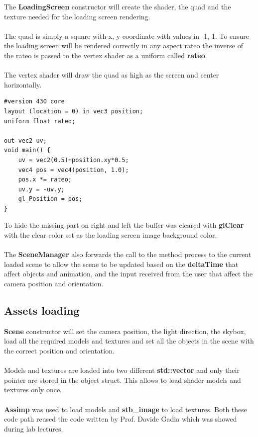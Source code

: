 \documentclass[12pt, a4paper]{article}
\begin{document}
The \textbf{LoadingScreen} constructor will create the shader, the quad and the texture needed for the loading screen
rendering.\\\\
The quad is simply a square with x, y coordinate with values in -1, 1. To ensure the loading screen will be rendered correctly
in any aspect rateo the inverse of the rateo is passed to the vertex shader as a uniform called \textbf{rateo}.\\\\
The vertex shader will draw the quad as high as the screen and center horizontally.
\begin{lstlisting}[caption={Loading screen vertex shader},captionpos=b]
#version 430 core
layout (location = 0) in vec3 position;
uniform float rateo;
    
out vec2 uv;
void main() {
    uv = vec2(0.5)+position.xy*0.5;
    vec4 pos = vec4(position, 1.0);
    pos.x *= rateo;
    uv.y = -uv.y;
    gl_Position = pos;
}
\end{lstlisting}
To hide the missing part on right and left
the buffer was cleared with \textbf{glClear} with the clear color set as the loading screen image background color.\\\\
The \textbf{SceneManager} also forwards the call to the method process to the current loaded scene to allow the scene
to be updated based on the \textbf{deltaTime} that affect objects and animation, and the input received from the user
that affect the camera position and orientation.

\subsection{Assets loading}
\textbf{Scene} constructor will set the camera position, the light direction, the skybox, load all the required models and textures
and set all the objects in the scene with the correct position and orientation.\\\\
Models and textures are loaded into two different \textbf{std::vector} and only their pointer are stored in the object struct.
This allows to load shader models and textures only once.\\\\
\textbf{Assimp} was used to load models and \textbf{stb\_image} to load textures. Both these code path
reused the code written by Prof. Davide Gadia which was showed during lab lectures.
\end{document}
